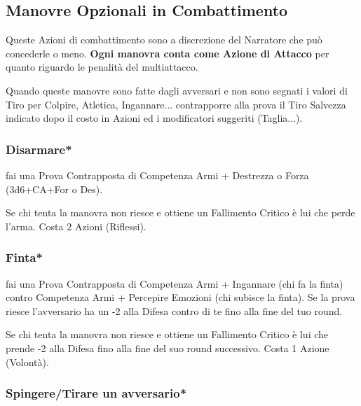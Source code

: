 \begin{multicols}{2}
\subsection{Manovre Opzionali in Combattimento}\label{azioniopzionaliincombattimento}

Queste Azioni di combattimento sono a discrezione del Narratore che può concederle o meno. \textbf{Ogni manovra conta come Azione di Attacco} per quanto riguardo le penalità del multiattacco.

Quando queste manovre sono fatte dagli avversari e non sono segnati i valori di Tiro per Colpire, Atletica, Ingannare... contrapporre alla prova il Tiro Salvezza indicato dopo il costo in Azioni ed i modificatori suggeriti (Taglia...).

\medskip

\subsubsection{Disarmare*}\label{disarmare}\hypertarget{disarmare}{}

fai una Prova Contrapposta di Competenza Armi + Destrezza o Forza (3d6+CA+For o Des).

Se chi tenta la manovra non riesce e ottiene un Fallimento Critico è lui che perde l'arma. Costa 2 Azioni (Riflessi).

\subsubsection{Finta*} \label{finta}\hypertarget{finta}{}

fai una Prova Contrapposta di Competenza Armi + Ingannare (chi fa la finta) contro Competenza Armi + Percepire Emozioni (chi subisce la finta). Se la prova riesce l'avversario ha un -2 alla Difesa contro di te fino alla fine del tuo round.

Se chi tenta la manovra non riesce e ottiene un Fallimento Critico è lui che prende -2 alla Difesa fino alla fine del suo round successivo. Costa 1 Azione (Volontà).


\subsubsection{Spingere/Tirare un avversario*} \label{spingereavversario}\hypertarget{spingereavversario}{}


\end{multicols}
